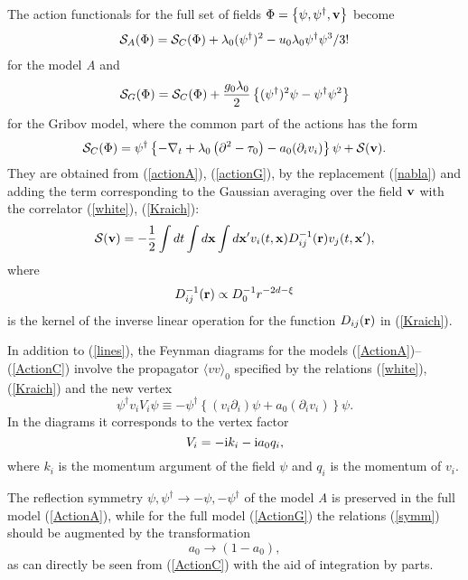 \documentclass[12pt]{iopart}
\def\S{{\cal S}}
\def\bfr{{\bf r}}
\def\bfx{{\bf x}}
\def\bfv{{\bf v}}
\begin{document}
The action functionals for the full set of fields
$\Phi = \left\{ \psi,\psi^{\dag},{\bf v} \right\}$ become
\begin{eqnarray}
\S_{A}(\Phi) = \S_{C}(\Phi) + \lambda_{0} (\psi^{\dag})^{2}
- u_{0}\lambda_{0} \psi^{\dag} \psi^{3} /3!
\label{ActionA}
\end{eqnarray}
for the model {\it A} and
\begin{eqnarray}
\S_{G}(\Phi) = \S_{C}(\Phi)
+ \frac{g_{0}\lambda_{0}}{2} \left\{ (\psi^{\dagger})^2\psi -
\psi^{\dagger}\psi^2  \right\}
\label{ActionG}
\end{eqnarray}
for the Gribov model, where the common part of the actions has the form
\begin{eqnarray}
\S_{C}(\Phi) =  \psi^{\dag} \left\{
-\nabla_{t} + \lambda_{0}\left( \partial^{2}- \tau_{0}\right)
- a_{0} (\partial_{i}v_{i}) \right\} \psi +  \S(\bfv).
\label{ActionC}
\end{eqnarray}
They are obtained from (\ref{actionA}), (\ref{actionG}), by the replacement
(\ref{nabla}) and adding the term corresponding to the Gaussian averaging
over the field $\bfv$ with the correlator (\ref{white}), (\ref{Kraich}):
\begin{eqnarray}
\S(\bfv) = -\frac{1}{2} \int dt \int d{\bf x} \int d{\bf x'}
v_{i} (t,\bfx) D_{ij}^{-1}(\bfr) v_{j} (t, {\bf x'}),
\label{Sv}
\end{eqnarray}
where
\[ D_{ij}^{-1}(\bfr) \propto D_{0}^{-1} r^{-2d-\xi} \]
is the kernel of the inverse linear operation for the function
$D_{ij}(\bfr)$ in (\ref{Kraich}).

In addition to (\ref{lines}), the Feynman diagrams for the models
(\ref{ActionA})--(\ref{ActionC}) involve the propagator
$\langle vv \rangle_{0}$ specified by the relations (\ref{white}),
(\ref{Kraich}) and the new vertex
\begin{equation}
\psi^{\dag} v_{i} V_{i} \psi \equiv -
\psi^{\dag}\left\{ (v_{i}\partial_{i}) \psi + a_{0}(\partial_{i}v_{i})
\right\} \psi.
\label{Vertex}
\end{equation}
In the diagrams it corresponds to the vertex factor
\begin{equation}
V_{i} = - {\rm i} k_{i} - {\rm i} a_{0} q_{i},
\label{VertexF}
\end{equation}
where $k_{i}$ is the momentum argument of the field $\psi$ and
$q_{i}$ is the momentum of $v_{i}$.

The reflection symmetry $\psi, \psi^{\dag} \to -\psi, -\psi^{\dag}$
of the model
{\it A} is preserved in the full model (\ref{ActionA}), while for
the full model (\ref{ActionG}) the relations (\ref{symm}) should be
augmented by the transformation
\begin{equation}
a_{0} \to (1-a_{0}),
\label{symmG}
\end{equation}
as can directly be seen from (\ref{ActionC}) with the aid of integration
by parts.
\end{document}
